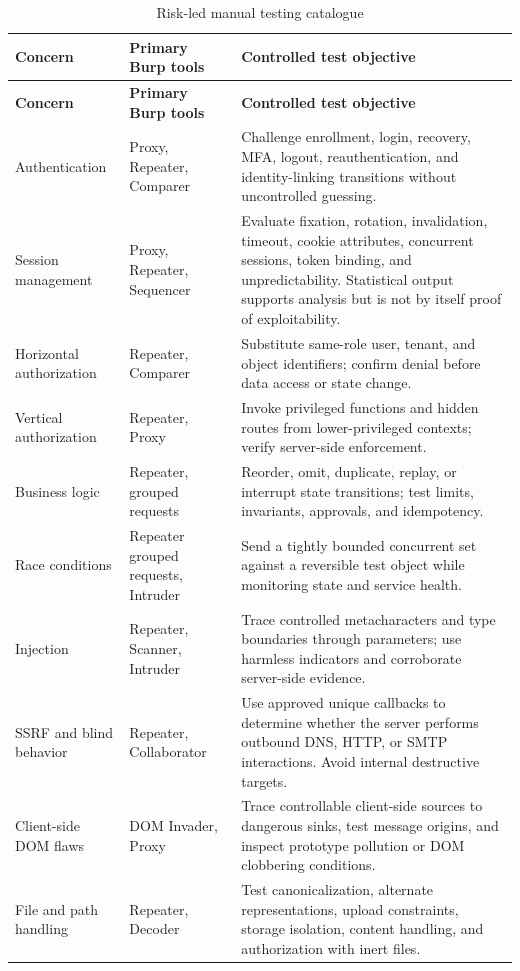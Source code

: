 \documentclass[11pt,letterpaper]{article}
\begin{document}
\begin{longtable}{@{}L{1.25in}L{1.85in}L{3.45in}@{}}
\caption{Risk-led manual testing catalogue}\label{tab:manual-catalogue}\\
\toprule
\textbf{Concern} & \textbf{Primary Burp tools} & \textbf{Controlled test objective} \\
\midrule
\endfirsthead
\toprule
\textbf{Concern} & \textbf{Primary Burp tools} & \textbf{Controlled test objective} \\
\midrule
\endhead
Authentication & Proxy, Repeater, Comparer & Challenge enrollment, login, recovery, MFA, logout, reauthentication, and identity-linking transitions without uncontrolled guessing. \\
Session management & Proxy, Repeater, Sequencer & Evaluate fixation, rotation, invalidation, timeout, cookie attributes, concurrent sessions, token binding, and unpredictability. Statistical output supports analysis but is not by itself proof of exploitability. \\
Horizontal authorization & Repeater, Comparer & Substitute same-role user, tenant, and object identifiers; confirm denial before data access or state change. \\
Vertical authorization & Repeater, Proxy & Invoke privileged functions and hidden routes from lower-privileged contexts; verify server-side enforcement. \\
Business logic & Repeater, grouped requests & Reorder, omit, duplicate, replay, or interrupt state transitions; test limits, invariants, approvals, and idempotency. \\
Race conditions & Repeater grouped requests, Intruder & Send a tightly bounded concurrent set against a reversible test object while monitoring state and service health. \\
Injection & Repeater, Scanner, Intruder & Trace controlled metacharacters and type boundaries through parameters; use harmless indicators and corroborate server-side evidence. \\
SSRF and blind behavior & Repeater, Collaborator & Use approved unique callbacks to determine whether the server performs outbound DNS, HTTP, or SMTP interactions. Avoid internal destructive targets. \\
Client-side DOM flaws & DOM Invader, Proxy & Trace controllable client-side sources to dangerous sinks, test message origins, and inspect prototype pollution or DOM clobbering conditions. \\
File and path handling & Repeater, Decoder & Test canonicalization, alternate representations, upload constraints, storage isolation, content handling, and authorization with inert files. \\

\end{longtable}
\end{document}
